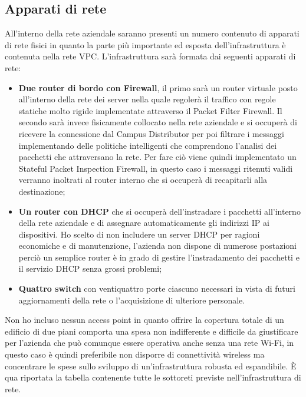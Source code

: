 \subsection{Apparati di rete}
All'interno della rete aziendale saranno presenti un numero contenuto di apparati di rete fisici in quanto la parte più importante ed esposta dell'infrastruttura è contenuta nella rete VPC. L'infrastruttura sarà formata dai seguenti apparati di rete: 
\begin{itemize}
    \item \textbf{Due router di bordo con Firewall}, il primo sarà un router virtuale posto all'interno della rete dei server nella quale regolerà il traffico con regole statiche molto rigide implementate attraverso il Packet Filter Firewall. Il secondo sarà invece fisicamente collocato nella rete aziendale e si occuperà di ricevere la connessione dal Campus Distributor per poi filtrare i messaggi implementando delle politiche intelligenti che comprendono l'analisi dei pacchetti che attraversano la rete. Per fare ciò viene quindi implementato un Stateful Packet Inspection Firewall, in questo caso i messaggi ritenuti validi verranno inoltrati al router interno che si occuperà di recapitarli alla destinazione;
    \item \textbf{Un router con DHCP} che si occuperà dell'instradare i pacchetti all'interno della rete aziendale e di assegnare automaticamente gli indirizzi IP ai dispositivi. Ho scelto di non includere un server DHCP per ragioni economiche e di manutenzione, l'azienda non dispone di numerose postazioni perciò un semplice router è in grado di gestire l'instradamento dei pacchetti e il servizio DHCP senza grossi problemi;
    \item \textbf{Quattro switch} con ventiquattro porte ciascuno necessari in vista di futuri aggiornamenti della rete o l'acquisizione di ulteriore personale. 
\end{itemize}
Non ho incluso nessun access point in quanto offrire la copertura totale di un edificio di due piani comporta una spesa non indifferente e difficile da giustificare per l'azienda che può comunque essere operativa anche senza una rete Wi-Fi, in questo caso è quindi preferibile non disporre di connettività wireless ma concentrare le spese sullo sviluppo di un'infrastruttura robusta ed espandibile. È qua riportata la tabella contenente tutte le sottoreti previste nell'infrastruttura di rete. 
